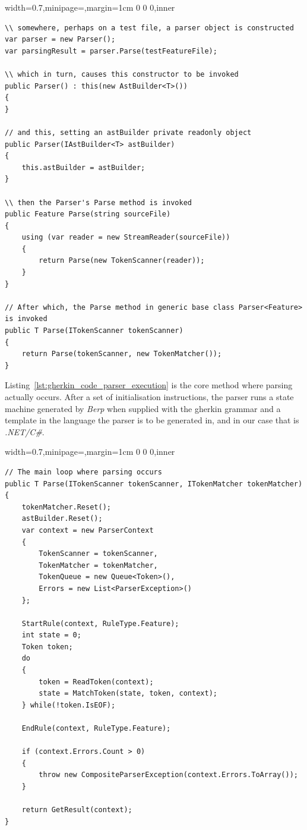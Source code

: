 \documentclass[dissertation,final]{softeng}
\newenvironment{featurecode}[1]
{ \lrbox\featurebox \begin{adjustbox}{width=#1\textwidth,minipage=\textwidth,margin=1cm 0 0 0,inner} }
{ \end{adjustbox}\endlrbox}
\newenvironment{featurelist}[2]
{
\newcommand{\setcaption}{\caption{#1}}
\newcommand{\setlabel}{\label{#2}}
}
{\begin{listing}[h!]\centering\usebox\featurebox\setcaption\setlabel\end{listing}}
\begin{document}
\begin{featurelist}{Parser construction}{lst:gherkin_code_parser_construction}
\begin{featurecode}{0.7}
\begin{verbatim}
\\ somewhere, perhaps on a test file, a parser object is constructed
var parser = new Parser();
var parsingResult = parser.Parse(testFeatureFile);

\\ which in turn, causes this constructor to be invoked
public Parser() : this(new AstBuilder<T>())
{
}

// and this, setting an astBuilder private readonly object
public Parser(IAstBuilder<T> astBuilder)
{
    this.astBuilder = astBuilder;
}

\\ then the Parser's Parse method is invoked
public Feature Parse(string sourceFile)
{
    using (var reader = new StreamReader(sourceFile))
    {
        return Parse(new TokenScanner(reader));
    }
}

// After which, the Parse method in generic base class Parser<Feature> is invoked
public T Parse(ITokenScanner tokenScanner)
{
    return Parse(tokenScanner, new TokenMatcher());
}
\end{verbatim}
\end{featurecode}
\end{featurelist}

Listing~\ref{lst:gherkin_code_parser_execution} is the core method where parsing actually occurs. After a set of initialisation instructions, the parser runs a state machine generated by \emph{Berp} when supplied with the gherkin grammar and a template in the language the parser is to be generated in, and in our case that is \emph{.NET/C\#}.

\begin{featurelist}{Parser execution}{lst:gherkin_code_parser_execution}
\begin{featurecode}{0.7}
\begin{verbatim}
// The main loop where parsing occurs
public T Parse(ITokenScanner tokenScanner, ITokenMatcher tokenMatcher)
{
    tokenMatcher.Reset();
    astBuilder.Reset();
    var context = new ParserContext
    {
        TokenScanner = tokenScanner,
        TokenMatcher = tokenMatcher,
        TokenQueue = new Queue<Token>(),
        Errors = new List<ParserException>()
    };

    StartRule(context, RuleType.Feature);
    int state = 0;
    Token token;
    do
    {
        token = ReadToken(context);
        state = MatchToken(state, token, context);
    } while(!token.IsEOF);

    EndRule(context, RuleType.Feature);

    if (context.Errors.Count > 0)
    {
        throw new CompositeParserException(context.Errors.ToArray());
    }

    return GetResult(context);
}
\end{verbatim}
\end{featurecode}
\end{featurelist}
\end{document}
